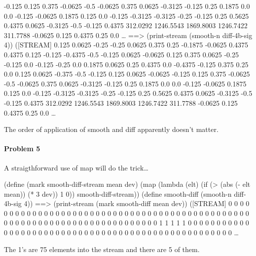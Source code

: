          -0.125   0.125   0.375  -0.0625 -0.5    -0.0625  0.375   0.0625 -0.3125
         -0.125   0.25    0.1875  0.0     0.0    -0.125  -0.0625  0.1875  0.125
          0.0    -0.125  -0.3125 -0.3125 -0.25   -0.125   0.25    0.5625  0.4375
          0.0625 -0.3125 -0.5    -0.125   0.4375 312.0292 1246.5543 1869.8003
          1246.7422  311.7788    -0.0625  0.125   0.4375  0.25 0.0 \ldots
\null
==> (print-stream (smooth-n diff-4b-sig 4))
([STREAM] 0.125   0.0625 -0.25   -0.25    0.0625  0.375   0.25   -0.1875 -0.0625
          0.4375  0.4375  0.125  -0.125  -0.4375 -0.5    -0.125   0.0625 -0.0625
          0.125   0.375   0.0625 -0.25   -0.125   0.0    -0.125  -0.25    0.0
          0.1875  0.0625  0.25    0.4375  0.0    -0.4375 -0.125   0.375   0.25
          0.0     0.125   0.0625 -0.375  -0.5    -0.125   0.125   0.0625 -0.0625
         -0.125   0.125   0.375  -0.0625 -0.5    -0.0625  0.375   0.0625 -0.3125
         -0.125   0.25    0.1875  0.0     0.0    -0.125  -0.0625  0.1875  0.125
          0.0    -0.125  -0.3125 -0.3125 -0.25   -0.125   0.25    0.5625  0.4375
          0.0625 -0.3125 -0.5    -0.125   0.4375 312.0292 1246.5543 1869.8003
          1246.7422  311.7788    -0.0625  0.125   0.4375  0.25 0.0 \ldots
\endlisp

The order of application of {\cf smooth} and {\cf diff} apparently doesn't
matter.

\newpage

\paragraph{Problem 5}

A straigthforward use of {\cf map} will do the trick\ldots

\beginlisp
(define (mark smooth-diff-stream mean dev)
  (map (lambda (elt) (if (> (abs (- elt mean)) (* 3 dev))
                         1
                         0))
       smooth-diff-stream))
\null
(define smooth-diff (smooth-n diff-4b-sig 4))
\null
==> (print-stream (mark smooth-diff mean dev))
([STREAM] 0 0 0 0 0 0 0 0 0 0 0 0 0 0 0 0 0 0 0 0 0 0 0 0 0 0 0 0 0 0 0 0 0
          0 0 0 0 0 0 0 0 0 0 0 0 0 0 0 0 0 0 0 0 0 0 0 0 0 0 0 0 0 0 0 0 0
          0 0 0 0 0 0 0 0 1 1 1 1 1 0 0 0 0 0 0 0 0 0 0 0 0 0 0 0 0 0 0 0 0
          0 0 0 0 0 0 0 0 0 0 0 0 0 0 0 0 0 0 0 0 0 0 0 0 0 0 0 0 0 0 0 \ldots
\endlisp

The 1's are 75 elements into the stream and there are 5 of them.

